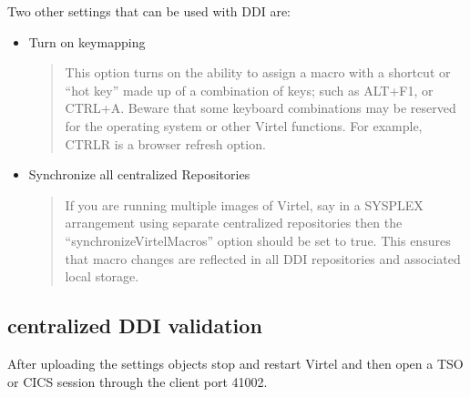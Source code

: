 \documentclass[letterpaper,10pt,english]{sphinxmanual}
\begin{document}
\sphinxAtStartPar
Two other settings that can be used with DDI are: \sphinxhyphen{}
\begin{itemize}
\item {} 
\sphinxAtStartPar
{}                        Turn on keymapping
\begin{quote}

\sphinxAtStartPar
This option turns on the ability to assign a macro with a shortcut or “hot key” made up of a combination of keys; such as ALT+F1, or CTRL+A.  Beware that some keyboard combinations may be reserved for the operating system or other Virtel functions. For example, CTRL\sphinxhyphen{}R is a browser refresh option.
\end{quote}

\item {} 
\sphinxAtStartPar
{}           Synchronize all centralized Repositories
\begin{quote}

\sphinxAtStartPar
If you are running multiple images of Virtel, say in a SYSPLEX arrangement using separate centralized repositories then the “synchronizeVirtelMacros” option should be set to true. This ensures that macro changes are reflected in all DDI repositories and associated local storage.
\end{quote}

\end{itemize}

\ignorespaces 

\subsection{centralized DDI validation}
\label{\detokenize{Customization:centralized-ddi-validation}}\label{\detokenize{Customization:index-84}}
\sphinxAtStartPar
After uploading the settings objects stop and restart Virtel and then open a TSO or CICS session through the client port 41002.

\begin{sphinxVerbatim}[commandchars=\\\{\}]
\end{sphinxVerbatim}
\end{document}

